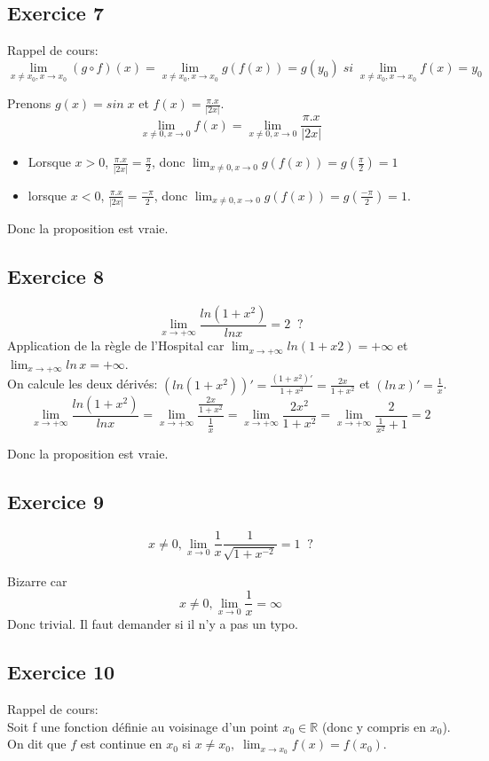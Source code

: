 \documentclass[]{book}
\theoremstyle{definition}
\newcommand{\bb}[1]{\mathbb{#1}}
\newcommand{\R}{\bb{R}}
\begin{document}
\subsection*{Exercice 7}
Rappel de cours:
$$\lim_{x \neq x_0, x \to x_0}(g \circ f)(x) = \lim_{x \neq x_0, x \to x_0}g(f(x)) = g(y_0)\; si\; \lim_{x \neq x_0, x \to x_0} f(x) = y_0 $$

Prenons $g(x) = sin\; x$ et $f(x) = \frac{\pi.x}{|2x|}$. 
$$ \lim_{x \neq 0, x \to 0} f(x) = \lim_{x \neq 0, x \to 0} \frac{\pi.x}{|2x|}$$
\begin{itemize}
\item Lorsque $x>0$, $\frac{\pi.x}{|2x|} = \frac{\pi}{2}$, donc $\lim_{x \neq 0, x \to 0} g(f(x)) = g(\frac{\pi}{2}) = 1$ 
\item lorsque $x<0$, $\frac{\pi.x}{|2x|} = \frac{-\pi}{2}$, donc $\lim_{x \neq 0, x \to 0} g(f(x)) = g(\frac{-\pi}{2}) = 1$.
\end{itemize}


Donc la proposition est vraie.


\subsection*{Exercice 8}
$$\lim_{x \to +\infty} \frac{ln(1+x^2)}{ln x} = 2 \;\;?$$
Application de la r\`egle de l'Hospital car $\lim_{x \to +\infty} ln(1+x2) = +\infty$ et $\lim_{x \to +\infty} ln\, x = +\infty$.\\

On calcule les deux d\'eriv\'es: $(ln(1+x^2))' = \frac{(1+x^2)'}{1+x^2} = \frac{2x}{1+x^2}$ et $(ln\, x)' = \frac{1}{x}$.
$$ \lim_{x \to +\infty} \frac{ln(1+x^2)}{ln x} = \lim_{x \to +\infty} \frac{\frac{2x}{1+x^2}}{\frac{1}{x}} = \lim_{x \to +\infty} \frac{2x^2}{1+x^2} = \lim_{x \to +\infty} \frac{2}{\frac{1}{x^2}+1} = 2$$


Donc la proposition est vraie.

\subsection*{Exercice 9}
$$x \neq 0, \lim_{x \to 0} \frac{1}{x} \frac{1}{\sqrt{1+x^{-2}}}= 1 \;\;?$$

Bizarre car
$$x \neq 0, \lim_{x \to 0} \frac{1}{x} = \infty$$
Donc trivial. Il faut demander si il n'y a pas un typo.


\subsection*{Exercice 10}
Rappel de cours:\\
Soit f une fonction d\'efinie au voisinage d'un point $x_0 \in \R$ (donc y compris en
$x_0$). On dit que $f$ est continue en $x_0$ si $x \ne x_0,\;\lim_{x \to x_0} f(x) = f(x_0)$.
\end{document}
